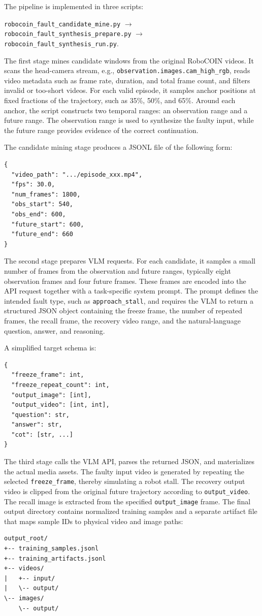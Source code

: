 The pipeline is implemented in three scripts:
\begin{center}
\small
\texttt{robocoin\_fault\_candidate\_mine.py}
$\rightarrow$
\texttt{robocoin\_fault\_synthesis\_prepare.py}
$\rightarrow$
\texttt{robocoin\_fault\_synthesis\_run.py}.
\end{center}

The first stage mines candidate windows from the original RoboCOIN videos. It scans the head-camera stream, e.g., \texttt{observation.images.cam\_high\_rgb}, reads video metadata such as frame rate, duration, and total frame count, and filters invalid or too-short videos. For each valid episode, it samples anchor positions at fixed fractions of the trajectory, such as 35\%, 50\%, and 65\%. Around each anchor, the script constructs two temporal ranges: an observation range and a future range. The observation range is used to synthesize the faulty input, while the future range provides evidence of the correct continuation.

The candidate mining stage produces a JSONL file of the following form:
\begin{verbatim}
{
  "video_path": ".../episode_xxx.mp4",
  "fps": 30.0,
  "num_frames": 1800,
  "obs_start": 540,
  "obs_end": 600,
  "future_start": 600,
  "future_end": 660
}
\end{verbatim}

The second stage prepares VLM requests. For each candidate, it samples a small number of frames from the observation and future ranges, typically eight observation frames and four future frames. These frames are encoded into the API request together with a task-specific system prompt. The prompt defines the intended fault type, such as \texttt{approach\_stall}, and requires the VLM to return a structured JSON object containing the freeze frame, the number of repeated frames, the recall frame, the recovery video range, and the natural-language question, answer, and reasoning.

A simplified target schema is:
\begin{verbatim}
{
  "freeze_frame": int,
  "freeze_repeat_count": int,
  "output_image": [int],
  "output_video": [int, int],
  "question": str,
  "answer": str,
  "cot": [str, ...]
}
\end{verbatim}

The third stage calls the VLM API, parses the returned JSON, and materializes the actual media assets. The faulty input video is generated by repeating the selected \texttt{freeze\_frame}, thereby simulating a robot stall. The recovery output video is clipped from the original future trajectory according to \texttt{output\_video}. The recall image is extracted from the specified \texttt{output\_image} frame. The final output directory contains normalized training samples and a separate artifact file that maps sample IDs to physical video and image paths:
\begin{verbatim}
output_root/
+-- training_samples.jsonl
+-- training_artifacts.jsonl
+-- videos/
|   +-- input/
|   \-- output/
\-- images/
    \-- output/
\end{verbatim}

